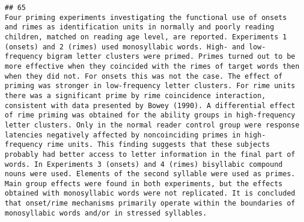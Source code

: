 \documentclass[
  english,
  man]{apa6}
\begin{document}
\begin{verbatim}
## 65                                                                                                                                                                                                                                                                                                                                                                                                                                                                                                                                                                                                                                                                                                                                                                                                                                                                                                                                                                                                                                                                                                                                                                                                               Four priming experiments investigating the functional use of onsets and rimes as identification units in normally and poorly reading children, matched on reading age level, are reported. Experiments 1 (onsets) and 2 (rimes) used monosyllabic words. High- and low-frequency bigram letter clusters were primed. Primes turned out to be more effective when they coincided with the rimes of target words then when they did not. For onsets this was not the case. The effect of priming was stronger in low-frequency letter clusters. For rime units there was a significant prime by rime coincidence interaction, consistent with data presented by Bowey (1990). A differential effect of rime priming was obtained for the ability groups in high-frequency letter clusters. Only in the normal reader control group were response latencies negatively affected by noncoinciding primes in high-frequency rime units. This finding suggests that these subjects probably had better access to letter information in the final part of words. In Experiments 3 (onsets) and 4 (rimes) bisyllabic compound nouns were used. Elements of the second syllable were used as primes. Main group effects were found in both experiments, but the effects obtained with monosyllabic words were not replicated. It is concluded that onset/rime mechanisms primarily operate within the boundaries of monosyllabic words and/or in stressed syllables.

\end{verbatim}
\end{document}
